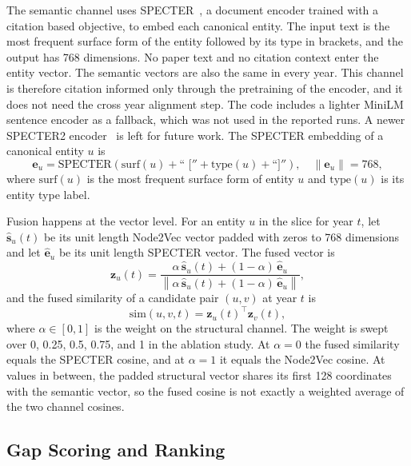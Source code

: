 \documentclass{ieeeaccess}
\begin{document}
The semantic channel uses SPECTER~\cite{cohan2020specter}, a document encoder trained with a citation based objective, to embed each canonical entity. The input text is the most frequent surface form of the entity followed by its type in brackets, and the output has 768 dimensions. No paper text and no citation context enter the entity vector. The semantic vectors are also the same in every year. This channel is therefore citation informed only through the pretraining of the encoder, and it does not need the cross year alignment step. The code includes a lighter MiniLM sentence encoder as a fallback, which was not used in the reported runs. A newer SPECTER2 encoder~\cite{singh2023scirepeval} is left for future work. The SPECTER embedding of a canonical entity $u$ is
\begin{equation}
\mathbf{e}_u = \text{SPECTER}(\text{surf}(u) + \text{``~[}'' + \text{type}(u) + \text{``]}''), \quad \|\mathbf{e}_u\| = 768,
\label{eq:specter}
\end{equation}
where $\text{surf}(u)$ is the most frequent surface form of entity $u$ and $\text{type}(u)$ is its entity type label.

Fusion happens at the vector level. For an entity $u$ in the slice for year $t$, let $\hat{\mathbf{s}}_u(t)$ be its unit length Node2Vec vector padded with zeros to 768 dimensions and let $\hat{\mathbf{e}}_u$ be its unit length SPECTER vector. The fused vector is
\begin{equation}
\mathbf{z}_u(t) = \frac{\alpha\,\hat{\mathbf{s}}_u(t) + (1 - \alpha)\,\hat{\mathbf{e}}_u}{\left\lVert \alpha\,\hat{\mathbf{s}}_u(t) + (1 - \alpha)\,\hat{\mathbf{e}}_u \right\rVert},
\label{eq:fusedvec}
\end{equation}
and the fused similarity of a candidate pair $(u, v)$ at year $t$ is
\begin{equation}
\text{sim}(u, v, t) = \mathbf{z}_u(t)^{\top}\mathbf{z}_v(t),
\label{eq:fusedsim}
\end{equation}
where $\alpha \in [0, 1]$ is the weight on the structural channel. The weight is swept over 0, 0.25, 0.5, 0.75, and 1 in the ablation study. At $\alpha = 0$ the fused similarity equals the SPECTER cosine, and at $\alpha = 1$ it equals the Node2Vec cosine. At values in between, the padded structural vector shares its first 128 coordinates with the semantic vector, so the fused cosine is not exactly a weighted average of the two channel cosines.

\subsection{Gap Scoring and Ranking}
\label{sec:gapscoring}
\end{document}
